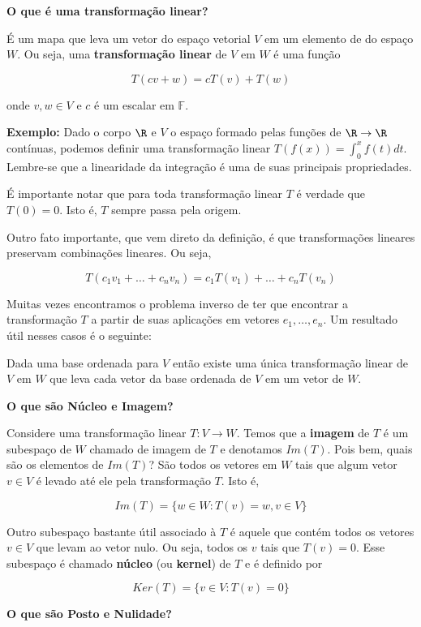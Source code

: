 \documentclass[
]{article}
\begin{document}
\textbf{O que é uma transformação linear?}

É um mapa que leva um vetor do espaço vetorial \(V\) em um elemento de
do espaço \(W\). Ou seja, uma \textbf{transformação linear} de \(V\) em
\(W\) é uma função

\[T(cv+w) = cT(v)+T(w)\]

onde \(v, w \in V\) e \(c\) é um escalar em \(\mathbb{F}\).

\textbf{Exemplo:} Dado o corpo \(\R\) e \(V\) o espaço formado pelas
funções de \(\R \to \R\) contínuas, podemos definir uma transformação
linear \(T(f(x)) = \int_0^x f(t)dt\). Lembre-se que a linearidade da
integração é uma de suas principais propriedades.

É importante notar que para toda transformação linear \(T\) é verdade
que \(T(0) = 0\). Isto é, \(T\) sempre passa pela origem.

Outro fato importante, que vem direto da definição, é que transformações
lineares preservam combinações lineares. Ou seja,

\[T(c_1v_1+\ldots+c_nv_n)=c_1T(v_1)+\ldots+c_nT(v_n)\]

Muitas vezes encontramos o problema inverso de ter que encontrar a
transformação \(T\) a partir de suas aplicações em vetores
\(e_1, \ldots, e_n\). Um resultado útil nesses casos é o seguinte:

Dada uma base ordenada para \(V\) então existe uma única transformação
linear de \(V\) em \(W\) que leva cada vetor da base ordenada de \(V\)
em um vetor de \(W\).

\textbf{O que são Núcleo e Imagem?}

Considere uma transformação linear \(T:V\to W\). Temos que a
\textbf{imagem} de \(T\) é um subespaço de \(W\) chamado de imagem de
\(T\) e denotamos \(Im(T)\). Pois bem, quais são os elementos de
\(Im(T)\)? São todos os vetores em \(W\) tais que algum vetor
\(v \in V\) é levado até ele pela transformação \(T\). Isto é,

\[Im(T) = \{ w \in W : T(v) = w, v \in V \}\]

Outro subespaço bastante útil associado à \(T\) é aquele que contém
todos os vetores \(v \in V\) que levam ao vetor nulo. Ou seja, todos os
\(v\) tais que \(T(v) = 0\). Esse subespaço é chamado \textbf{núcleo}
(ou \textbf{kernel}) de \(T\) e é definido por

\[Ker(T) = \{ v \in V : T(v) = 0 \}\]

\textbf{O que são Posto e Nulidade?}
\end{document}
